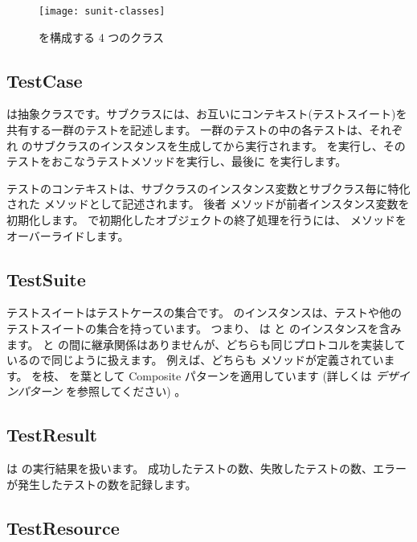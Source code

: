 \documentclass[a4paper,10pt,twoside]{book}
\begin{document}
\begin{figure}[htb]
  \begin{center}
		{\texttt{[image: sunit-classes]}}
	\caption{\SUnit を構成する 4 つのクラス}
  \end{center}
\end{figure}

\subsection{TestCase}

 は抽象クラスです。サブクラスには、お互いにコンテキスト(テストスイート)を共有する一群のテストを記述します。
一群のテストの中の各テストは、それぞれ  のサブクラスのインスタンスを生成してから実行されます。  を実行し、そのテストをおこなうテストメソッドを実行し、最後に  を実行します。

テストのコンテキストは、サブクラスのインスタンス変数とサブクラス毎に特化された  メソッドとして記述されます。 後者 メソッドが前者インスタンス変数を初期化します。  で初期化したオブジェクトの終了処理を行うには、  メソッドをオーバーライドします。

\subsection{TestSuite}

テストスイートはテストケースの集合です。
 のインスタンスは、テストや他のテストスイートの集合を持っています。
つまり、  は  と  のインスタンスを含みます。
 と  の間に継承関係はありませんが、どちらも同じプロトコルを実装しているので同じように扱えます。
例えば、どちらも  メソッドが定義されています。
 を枝、  を葉として Composite パターンを適用しています (詳しくは \textit{デザインパターン} を参照してください) 。

\subsection{TestResult}

 は  の実行結果を扱います。
成功したテストの数、失敗したテストの数、エラーが発生したテストの数を記録します。

\subsection{TestResource}
\end{document}
